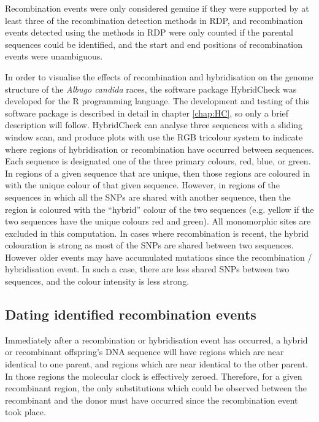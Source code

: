 Recombination events were only considered genuine if they were supported by at least three of the recombination detection methods in RDP, and recombination events detected using the methods in RDP were only counted if the parental sequences could be identified, and the start and end positions of recombination events were unambiguous.

In order to visualise the effects of recombination and hybridisation on the genome structure of the \textit{Albugo candida} races, the software package HybridCheck was developed for the R programming language. The development and testing of this software package is described in detail in chapter \ref{chap:HC}, so only a brief description will follow. HybridCheck can analyse three sequences with a sliding window scan, and produce plots with use the RGB tricolour system to indicate where regions of hybridisation or recombination have occurred between sequences. Each sequence is designated one of the three primary colours, red, blue, or green. In regions of a given sequence that are unique, then those regions are coloured in with the unique colour of that given sequence. However, in regions of the sequences in which all the SNPs are shared with another sequence, then the region is coloured with the “hybrid” colour of the two sequences (e.g. yellow if the two sequences have the unique colours red and green). All monomorphic sites are excluded in this computation. In cases where recombination is recent, the hybrid colouration is strong as most of the SNPs are shared between two sequences. However older events may have accumulated mutations since the recombination / hybridisation event. In such a case, there are less shared SNPs between two sequences, and the colour intensity is less strong.

\subsection{Dating identified recombination events}
Immediately after a recombination or hybridisation event has occurred, a hybrid or recombinant offspring's DNA sequence will have regions which are near identical to one parent, and regions which are near identical to the other parent. In those regions the molecular clock is effectively zeroed. Therefore, for a given recombinant region, the only substitutions which could be observed between the recombinant and the donor must have occurred since the recombination event took place.

